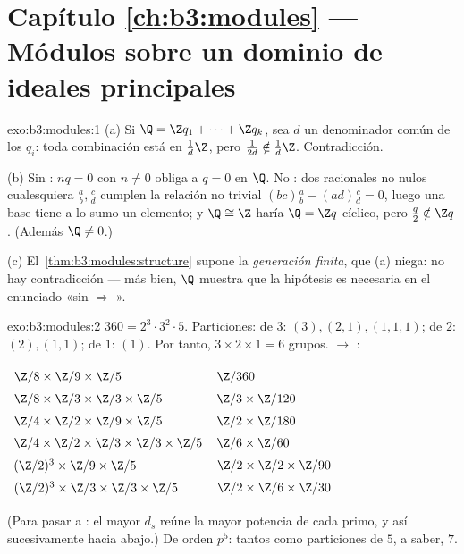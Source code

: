 \section*{Capítulo \ref{ch:b3:modules} --- Módulos sobre un dominio de
ideales principales}

\begin{solution}{exo:b3:modules:1}
(a) Si $\Q = \Z q_1 + \dots + \Z q_k$, sea $d$ un denominador común de
los $q_i$: toda combinación está en $\frac1d\Z$, pero
$\frac1{2d} \notin \frac1d\Z$. Contradicción.

(b) Sin : $nq = 0$ con
$n \neq 0$ obliga a $q = 0$ en $\Q$. No
: dos racionales no nulos
cualesquiera $\frac ab, \frac cd$ cumplen la relación no trivial
$(bc)\frac ab - (ad)\frac cd =
0$, luego una base tiene a lo sumo un elemento; y $\Q \cong \Z$ haría
$\Q = \Z q$ cíclico, pero $\frac q2 \notin \Z q$. (Además $\Q \neq
0$.)

(c) El~\cref{thm:b3:modules:structure} supone la \emph{generación
finita}, que (a) niega: no hay contradicción --- más bien, $\Q$ muestra
que la hipótesis es necesaria en el enunciado
«sin  $\Rightarrow$
».
\end{solution}

\begin{solution}{exo:b3:modules:2}
$360 = 2^3\cdot3^2\cdot5$. Particiones: de $3$: $(3), (2,1),
(1,1,1)$; de $2$: $(2), (1,1)$; de $1$: $(1)$. Por tanto, $3 \times 2
\times 1 = 6$ grupos.  $\to$ :
\begin{center}
\begin{tabular}{l l}
$\Z/8 \times \Z/9 \times \Z/5$ & $\Z/360$\\
$\Z/8 \times \Z/3 \times \Z/3 \times \Z/5$ & $\Z/3 \times
\Z/120$\\
$\Z/4 \times \Z/2 \times \Z/9 \times \Z/5$ & $\Z/2 \times
\Z/180$\\
$\Z/4 \times \Z/2 \times \Z/3 \times \Z/3 \times \Z/5$ & $\Z/6
\times \Z/60$\\
$(\Z/2)^3 \times \Z/9 \times \Z/5$ & $\Z/2 \times \Z/2 \times
\Z/90$\\
$(\Z/2)^3 \times \Z/3 \times \Z/3 \times \Z/5$ & $\Z/2 \times
\Z/6 \times \Z/30$
\end{tabular}
\end{center}
(Para pasar a : el
mayor $d_s$ reúne la mayor potencia de cada primo, y así sucesivamente
hacia abajo.) De orden $p^5$: tantos como particiones de $5$, a saber,
$7$.
\end{solution}

